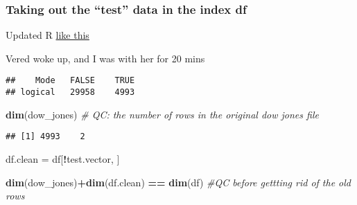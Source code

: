 \documentclass[
]{article}
\newenvironment{Shaded}{\begin{snugshade}}{\end{snugshade}}
\newcommand{\CommentTok}[1]{\textcolor[rgb]{0.56,0.35,0.01}{\textit{#1}}}
\newcommand{\KeywordTok}[1]{\textcolor[rgb]{0.13,0.29,0.53}{\textbf{#1}}}
\newcommand{\NormalTok}[1]{#1}
\newcommand{\OperatorTok}[1]{\textcolor[rgb]{0.81,0.36,0.00}{\textbf{#1}}}
\newcommand{\StringTok}[1]{\textcolor[rgb]{0.31,0.60,0.02}{#1}}
\begin{document}
\hypertarget{taking-out-the-test-data-in-the-index-df}{%
\subsubsection{Taking out the ``test'' data in the index
df}\label{taking-out-the-test-data-in-the-index-df}}

Updated R
\href{https://www.linkedin.com/pulse/3-methods-update-r-rstudio-windows-mac-woratana-ngarmtrakulchol/}{like
this}

Vered woke up, and I was with her for 20 mins

\begin{Shaded}
\end{Shaded}

\begin{verbatim}
##    Mode   FALSE    TRUE 
## logical   29958    4993
\end{verbatim}

\begin{Shaded}
\begin{Highlighting}[]
\KeywordTok{dim}\NormalTok{(dow_jones)                     }\CommentTok{# QC: the number of rows in the original dow jones file}
\end{Highlighting}
\end{Shaded}

\begin{verbatim}
## [1] 4993    2
\end{verbatim}

\begin{Shaded}
\begin{Highlighting}[]
\NormalTok{df.clean =}\StringTok{ }\NormalTok{df[}\OperatorTok{!}\NormalTok{test.vector, ]}

\KeywordTok{dim}\NormalTok{(dow_jones)}\OperatorTok{+}\KeywordTok{dim}\NormalTok{(df.clean) }\OperatorTok{==}\StringTok{ }\KeywordTok{dim}\NormalTok{(df)   }\CommentTok{#QC before gettting rid of the old rows}
\end{Highlighting}
\end{Shaded}
\end{document}
